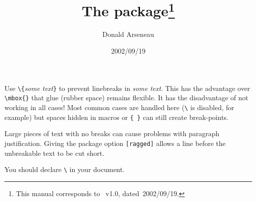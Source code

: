 \documentclass[pagesize=auto, fontsize=14pt, DIV=10, parskip=half]{scrartcl}
\title{The \pkg{nolbreaks} package\thanks{This manual corresponds to \pkg{nolbreaks}~v1.0, dated~2002/09/19.}}
\author{Donald Arseneau}
\date{2002/09/19}
\makeatletter
\newcommand*{\cs}[1]{\texttt{\textbackslash#1}}
\newcommand*{\cmd}[1]{\cs{\expandafter\@gobble\string#1}}
\newcommand*{\opt}[1]{\texttt{#1}}
\newcommand*{\meta}[1]{\textlangle\textsl{#1}\textrangle}
\newcommand*{\marg}[1]{\texttt{\{}\meta{#1}\texttt{\}}}
\makeatother
\begin{document}
\maketitle

Use \cmd{\nolbreaks}\marg{some text} to prevent linebreaks in \meta{some text}.
This has the advantage over \verb+\mbox{}+ that glue (rubber space) 
remains flexible.  It has the disadvantage of not working in 
all cases!  Most common cases are handled here (\cmd{\linebreak} is 
disabled, for example) but spaces hidden in macros or \verb+{ }+
can still create break-points.

Large pieces of text with no breaks can cause problems with
paragraph justification.  Giving the package option \opt{[ragged]}
allows a line before the unbreakable text to be cut short.

You should declare \cmd{\sloppy} in your document.
\end{document}
